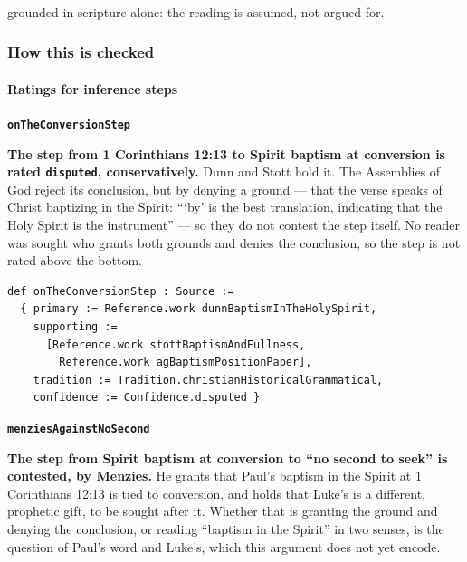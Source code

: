 \documentclass[11pt]{article}
\begin{document}
\noindent\footnotesize \textsuperscript{\dag} grounded in scripture alone: the reading is assumed, not argued for.
\normalsize
\subsubsection*{How this is checked}
\paragraph*{Ratings for inference steps}
\leavevmode\par\nobreak
\par\medskip\noindent\textbf{\texttt{on\allowbreak{}The\allowbreak{}Conversion\allowbreak{}Step}}\par\nobreak\noindent
\textbf{The step from 1 Corinthians 12:13 to Spirit baptism at conversion is rated \texttt{disputed}, conservatively.} Dunn and Stott hold it. The Assemblies of God reject its conclusion, but by denying a ground — that the verse speaks of Christ baptizing in the Spirit: “‘by’ is the best translation, indicating that the Holy Spirit is the instrument” — so they do not contest the step itself. No reader was sought who grants both grounds and denies the conclusion, so the step is not rated above the bottom.

{\small\begin{verbatim}
def onTheConversionStep : Source :=
  { primary := Reference.work dunnBaptismInTheHolySpirit,
    supporting :=
      [Reference.work stottBaptismAndFullness,
        Reference.work agBaptismPositionPaper],
    tradition := Tradition.christianHistoricalGrammatical,
    confidence := Confidence.disputed }
\end{verbatim}}
\par\medskip\noindent\textbf{\texttt{menzies\allowbreak{}Against\allowbreak{}No\allowbreak{}Second}}\par\nobreak\noindent
\textbf{The step from Spirit baptism at conversion to “no second to seek” is contested, by Menzies.} He grants that Paul’s baptism in the Spirit at 1 Corinthians 12:13 is tied to conversion, and holds that Luke’s is a different, prophetic gift, to be sought after it. Whether that is granting the ground and denying the conclusion, or reading “baptism in the Spirit” in two senses, is the question of Paul’s word and Luke’s, which this argument does not yet encode.
\end{document}
